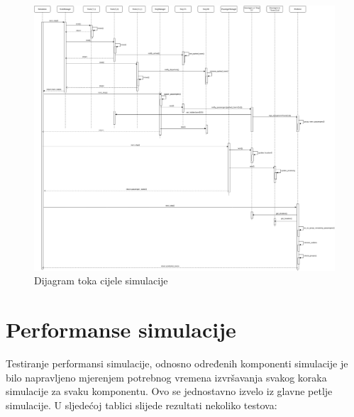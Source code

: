 \documentclass[times, utf8, diplomski]{fer}
\begin{document}
\begin{figure}[htb]
    \centering
    \includegraphics[width=1\textwidth]{images/simulation_sequence_diagram.png}
    \caption{Dijagram toka cijele simulacije}\label{fig:simulation_sequence_diagram}
\end{figure}


\section{Performanse simulacije}
Testiranje performansi simulacije, odnosno određenih komponenti simulacije je bilo napravljeno mjerenjem potrebnog vremena izvršavanja svakog koraka simulacije za svaku komponentu. Ovo se jednostavno izvelo iz glavne petlje simulacije. U sljedećoj tablici slijede rezultati nekoliko testova:
\end{document}

